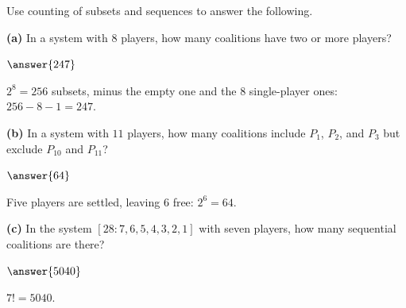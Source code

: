 \documentclass[12pt]{ximera}
\begin{document}
\begin{problem}
Use counting of subsets and sequences to answer the following.

\begin{prompt}
\textbf{(a)} In a system with $8$ players, how many coalitions have two or more
players?

$\answer{247}$

\begin{feedback}
$2^8=256$ subsets, minus the empty one and the $8$ single-player ones:
$256-8-1=247$.
\end{feedback}
\end{prompt}

\begin{prompt}
\textbf{(b)} In a system with $11$ players, how many coalitions include $P_1$, $P_2$,
and $P_3$ but exclude $P_{10}$ and $P_{11}$?

$\answer{64}$

\begin{feedback}
Five players are settled, leaving $6$ free: $2^6=64$.
\end{feedback}
\end{prompt}

\begin{prompt}
\textbf{(c)} In the system $[28:7,6,5,4,3,2,1]$ with seven players, how many
sequential coalitions are there?

$\answer{5040}$

\begin{feedback}
$7!=5040$.
\end{feedback}
\end{prompt}
\end{problem}
\end{document}
